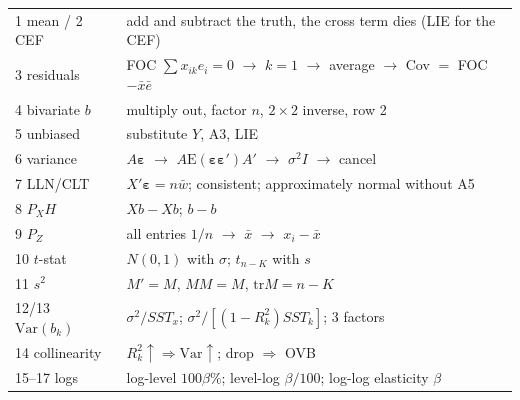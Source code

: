 \documentclass[10pt]{article}
\newcommand{\E}{\mathrm{E}}
\newcommand{\Var}{\mathrm{Var}}
\newcommand{\tr}{\mathrm{tr}}
\newcommand{\veps}{\bm{\varepsilon}}
\begin{document}
\vfill
\begin{tcolorbox}[colback=soft,colframe=ink,boxrule=0.5pt,arc=2pt,title={\bfseries\small Last-minute hooks (cover the answers and recite these)},fonttitle=\small]
\small
\begin{tabular}{@{}ll@{}}
1 mean / 2 CEF & add and subtract the truth, the cross term dies (LIE for the CEF)\\
3 residuals & FOC $\sum x_{ik}e_i=0$ $\to$ $k{=}1$ $\to$ average $\to$ Cov $=$ FOC $-\bar x\bar e$\\
4 bivariate $b$ & multiply out, factor $n$, $2\times2$ inverse, row 2\\
5 unbiased & substitute $Y$, A3, LIE\\
6 variance & $A\veps$ $\to$ $A\E(\veps\veps')A'$ $\to$ $\sigma^2I$ $\to$ cancel\\
7 LLN/CLT & $X'\veps=n\bar w$; consistent; approximately normal without A5\\
8 $P_XH$ & $Xb-Xb$; $b-b$\\
9 $P_Z$ & all entries $1/n$ $\to$ $\bar x$ $\to$ $x_i-\bar x$\\
10 $t$-stat & $N(0,1)$ with $\sigma$; $t_{n-K}$ with $s$\\
11 $s^2$ & $M'=M$, $MM=M$, $\tr M=n-K$\\
12/13 $\Var(b_k)$ & $\sigma^2/SST_x$; $\sigma^2/[(1-R_k^2)SST_k]$; 3 factors\\
14 collinearity & $R_k^2\uparrow\Rightarrow\Var\uparrow$; drop $\Rightarrow$ OVB\\
15--17 logs & log-level $100\beta\%$; level-log $\beta/100$; log-log elasticity $\beta$
\end{tabular}
\end{tcolorbox}
\end{document}
